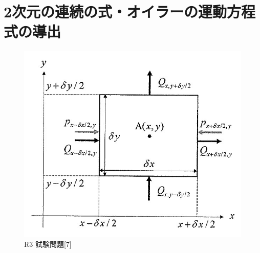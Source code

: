 \documentclass[a4paper]{jsarticle}
\begin{document}
\section{2次元の連続の式・オイラーの運動方程式の導出}
\begin{figure}[htbp]
    \begin{center}
        \includegraphics[width=120mm]{images/ryuriki_image1.jpg}
        \caption{R3 試験問題[7]}
    \end{center}
\end{figure}
\end{document}
